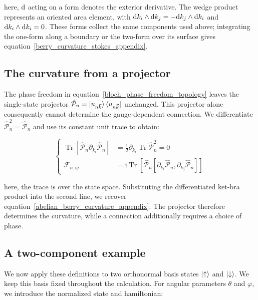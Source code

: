 here, $\mathrm{d}$ acting on a form denotes the exterior derivative.
The wedge product represents an oriented area element, with
$\mathrm{d} k_i\wedge\mathrm{d} k_j=-\mathrm{d} k_j\wedge\mathrm{d} k_i$ and $\mathrm{d} k_i\wedge\mathrm{d} k_i=0$.
These forms collect the same components used above;
integrating the one-form along a boundary or the two-form over its surface gives equation~\eqref{berry_curvature_stokes_appendix}.

\subsection{The curvature from a projector}

The phase freedom in equation~\eqref{bloch_phase_freedom_topology} leaves the single-state projector
$\hat{\mathcal{P}}_n=\ket{u_{n\vec{k}}}\bra{u_{n\vec{k}}}$ unchanged.
This projector alone consequently cannot determine the gauge-dependent connection.
We differentiate $\hat{\mathcal{P}}_n^2=\hat{\mathcal{P}}_n$ and use its constant unit trace to obtain:

\begin{equation}
\left\{\begin{aligned}
    \operatorname{Tr}\!\left[\hat{\mathcal{P}}_n\partial_{k_i}\hat{\mathcal{P}}_n\right]
    &=\frac{1}{2}\partial_{k_i}\operatorname{Tr}\hat{\mathcal{P}}_n^2=0 \\
    \mathcal{F}_{n,ij}
    &=\mathrm{i}\operatorname{Tr}\!\left[
    \hat{\mathcal{P}}_n[\partial_{k_i}\hat{\mathcal{P}}_n,\partial_{k_j}\hat{\mathcal{P}}_n]\right]
\end{aligned}\right.
\label{projector_berry_curvature_appendix}
\end{equation}

here, the trace is over the state space.
Substituting the differentiated ket-bra product into the second line, we recover equation~\eqref{abelian_berry_curvature_appendix}.
The projector therefore determines the curvature, while a connection additionally requires a choice of phase.

\subsection{A two-component example}
\label{subsec:berry_two_component_example_appendix}

We now apply these definitions to two orthonormal basis states $\ket{\uparrow}$ and $\ket{\downarrow}$.
We keep this basis fixed throughout the calculation.
For angular parameters $\theta$ and $\varphi$, we introduce the normalized state and hamiltonian:

